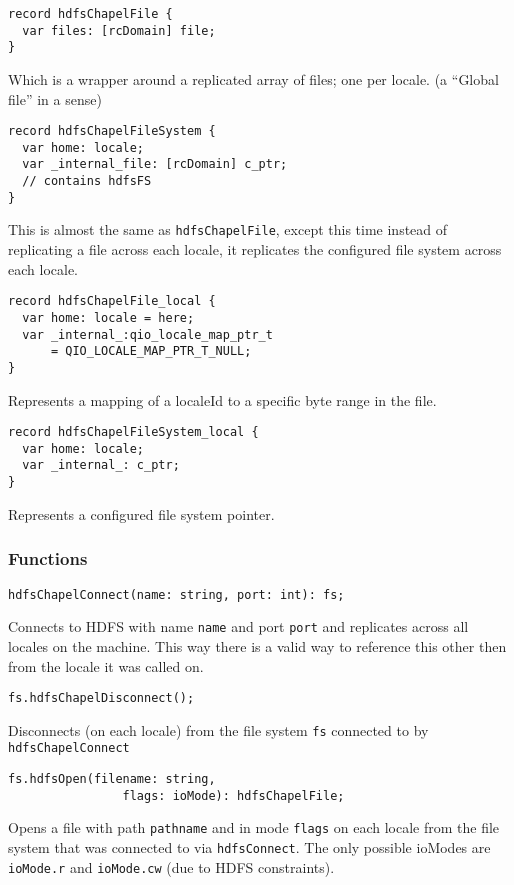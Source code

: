 \begin{lstlisting}
record hdfsChapelFile {
  var files: [rcDomain] file;
}
\end{lstlisting}
Which is a wrapper around a replicated array of files; one per locale. (\ie a
``Global file'' in a sense)

\begin{lstlisting}
record hdfsChapelFileSystem {
  var home: locale;
  var _internal_file: [rcDomain] c_ptr; 
  // contains hdfsFS
}
\end{lstlisting}
This is almost the same as {\tt hdfsChapelFile}, except this time instead of replicating
a file across each locale, it replicates the configured file system across each locale.

\begin{lstlisting}
record hdfsChapelFile_local {
  var home: locale = here;
  var _internal_:qio_locale_map_ptr_t 
      = QIO_LOCALE_MAP_PTR_T_NULL;
}
\end{lstlisting}
Represents a mapping of a localeId to a specific byte range in the file.

\begin{lstlisting}
record hdfsChapelFileSystem_local {
  var home: locale;
  var _internal_: c_ptr;
}
\end{lstlisting}
Represents a configured file system pointer. 

\subsubsection{Functions}
\begin{lstlisting}
hdfsChapelConnect(name: string, port: int): fs;
\end{lstlisting}
Connects to HDFS with name {\tt name} and port {\tt port} and replicates across all locales
on the machine. This way there is a valid way to reference this other then from the
locale it was called on.

\begin{lstlisting}
fs.hdfsChapelDisconnect();
\end{lstlisting}
Disconnects (on each locale) from the file system {\tt fs} connected to
by {\tt hdfsChapelConnect}

\begin{lstlisting}
fs.hdfsOpen(filename: string, 
                flags: ioMode): hdfsChapelFile;
\end{lstlisting}
Opens a file with path {\tt pathname} and in mode {\tt flags} on each locale from the file system
that was connected to via {\tt hdfsConnect}. The only possible ioModes are
{\tt ioMode.r} and {\tt ioMode.cw} (due to HDFS constraints).

